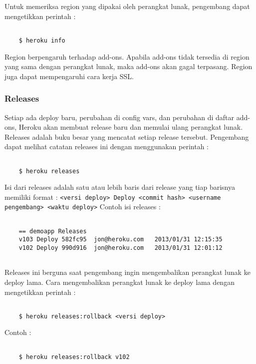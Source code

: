 Untuk memeriksa region yang dipakai oleh perangkat lunak, pengembang dapat mengetikkan perintah :
\begin{lstlisting}

	$ heroku info

\end{lstlisting}

Region berpengaruh terhadap add-ons. Apabila add-ons tidak tersedia di region yang sama dengan perangkat lunak, maka add-ons akan gagal terpasang. Region juga dapat mempengaruhi cara kerja SSL.

\subsubsection{Releases}
Setiap ada deploy baru, perubahan di config vars, dan perubahan di daftar add-ons, Heroku akan membuat release baru dan memulai ulang perangkat lunak. Releases adalah buku besar yang mencatat setiap release tersebut. Pengembang dapat melihat catatan releases ini dengan menggunakan perintah :
\begin{lstlisting}

	$ heroku releases

\end{lstlisting}
Isi dari releases adalah satu atau lebih baris dari release yang tiap barisnya memiliki format : \texttt{<versi deploy> Deploy <commit hash> <username pengembang> <waktu deploy>} Contoh isi releases :
\begin{lstlisting}

	== demoapp Releases
	v103 Deploy 582fc95  jon@heroku.com   2013/01/31 12:15:35
	v102 Deploy 990d916  jon@heroku.com   2013/01/31 12:01:12
	
\end{lstlisting}

Releases ini berguna saat pengembang ingin mengembalikan perangkat lunak ke deploy lama. Cara mengembalikan perangkat lunak ke deploy lama dengan mengetikkan perintah :
\begin{lstlisting}

	$ heroku releases:rollback <versi deploy>

\end{lstlisting}
Contoh :
\begin{lstlisting}

	$ heroku releases:rollback v102

\end{lstlisting}

